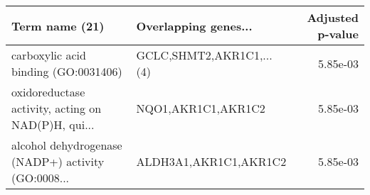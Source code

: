 \begin{tabular}{llr}
\toprule
                                    Term name (21) &     Overlapping genes... &  Adjusted p-value \\
\midrule
              carboxylic acid binding (GO:0031406) & GCLC,SHMT2,AKR1C1,...(4) &          5.85e-03 \\
oxidoreductase activity, acting on NAD(P)H, qui... &       NQO1,AKR1C1,AKR1C2 &          5.85e-03 \\
alcohol dehydrogenase (NADP+) activity (GO:0008... &    ALDH3A1,AKR1C1,AKR1C2 &          5.85e-03 \\
\bottomrule
\end{tabular}
